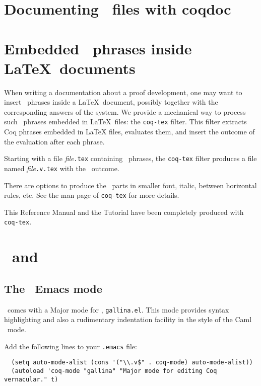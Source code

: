 \section[Documenting \Coq\ files with coqdoc]{Documenting \Coq\ files with coqdoc\label{coqdoc}
}



\section[Embedded \Coq\ phrases inside \LaTeX\ documents]{Embedded \Coq\ phrases inside \LaTeX\ documents\label{Latex}
  }

When writing a documentation about a proof development, one may want
to insert \Coq\ phrases inside a \LaTeX\ document, possibly together with
the corresponding answers of the system. We provide a
mechanical way to process such \Coq\ phrases embedded in \LaTeX\ files: the
{\tt coq-tex} filter.  This filter extracts Coq phrases embedded in
LaTeX files, evaluates them, and insert the outcome of the evaluation
after each phrase.

Starting with a file {\em file}{\tt.tex} containing \Coq\ phrases,
the {\tt coq-tex} filter produces a file named {\em file}{\tt.v.tex} with
the \Coq\ outcome.

There are options to produce the \Coq\ parts in smaller font, italic,
between horizontal rules, etc.
See the man page of {\tt coq-tex} for more details.

\medskip{} This Reference Manual and the Tutorial
have been completely produced with {\tt coq-tex}.


\section[\Coq\ and \emacs]{\Coq\ and \emacs\label{Emacs}}

\subsection{The \Coq\ Emacs mode}

\Coq\ comes with a Major mode for \emacs, {\tt gallina.el}. This mode provides
syntax highlighting
and also a rudimentary indentation facility
in the style of the Caml \emacs\ mode.

Add the following lines to your \verb!.emacs! file:

\begin{verbatim}
  (setq auto-mode-alist (cons '("\\.v$" . coq-mode) auto-mode-alist))
  (autoload 'coq-mode "gallina" "Major mode for editing Coq vernacular." t)
\end{verbatim}

